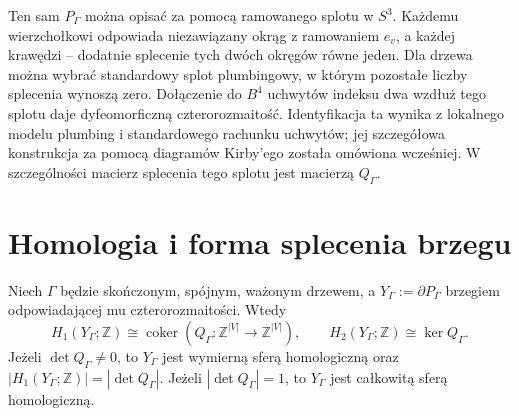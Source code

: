 \begin{center}
\end{center}

\begin{uwaga}
Ten sam $P_\Gamma$ można opisać za pomocą ramowanego splotu
w $S^3$. Każdemu wierzchołkowi odpowiada niezawiązany okrąg
z ramowaniem $e_v$, a każdej krawędzi -- dodatnie splecenie
tych dwóch okręgów równe jeden. Dla drzewa można wybrać
standardowy splot plumbingowy, w którym pozostałe liczby
splecenia wynoszą zero. Dołączenie do $B^4$ uchwytów indeksu
dwa wzdłuż tego splotu daje dyfeomorficzną czterorozmaitość.
Identyfikacja ta wynika z lokalnego modelu plumbing i
standardowego rachunku uchwytów; jej szczegółowa konstrukcja
za pomocą diagramów Kirby'ego została omówiona wcześniej.
W szczególności macierz splecenia tego splotu jest macierzą
$Q_\Gamma$.
\end{uwaga}

\section{Homologia i forma splecenia brzegu}
\label{sec:tg-plumbing-boundary}

\begin{twierdzenie}
\label{thm:tg-plumbing-boundary}
Niech $\Gamma$ będzie skończonym, spójnym, ważonym drzewem,
a $Y_\Gamma:=\partial P_\Gamma$ brzegiem odpowiadającej
mu czterorozmaitości. Wtedy
\[
H_1(Y_\Gamma;\mathbb Z)\cong
\operatorname{coker}(Q_\Gamma:\mathbb Z^{|V|}\to\mathbb Z^{|V|}),
\qquad
H_2(Y_\Gamma;\mathbb Z)\cong\ker Q_\Gamma.
\]
Jeżeli $\det Q_\Gamma\ne0$, to $Y_\Gamma$ jest wymierną
sferą homologiczną oraz
$|H_1(Y_\Gamma;\mathbb Z)|=|\det Q_\Gamma|$.
Jeżeli $|\det Q_\Gamma|=1$, to $Y_\Gamma$ jest całkowitą
sferą homologiczną.
\end{twierdzenie}

